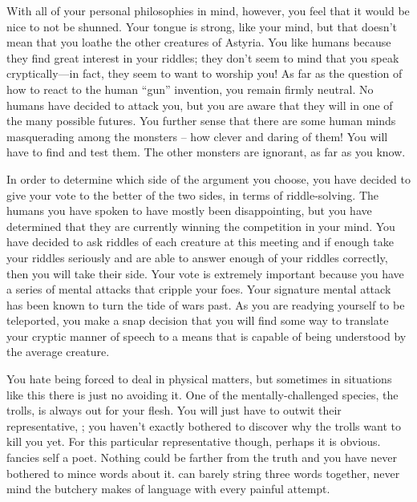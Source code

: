 \documentclass[char]{guildcamp2}
\begin{document}
With all of your personal philosophies in mind, however, you feel that it would be nice to not be shunned. Your tongue is strong, like your mind, but that doesn't mean that you loathe the other creatures of Astyria. You like humans because they find great interest in your riddles; they don't seem to mind that you speak cryptically---in fact, they seem to want to worship you! As far as the question of how to react to the human ``gun'' invention, you remain firmly neutral. No humans have decided to attack you, but you are aware that they will in one of the many possible futures. You further sense that there are some human minds masquerading among the monsters -- how clever and daring of them! You will have to find and test them. The other monsters are ignorant, as far as you know.

In order to determine which side of the argument you choose, you have decided to give your vote to the better of the two sides, in terms of riddle-solving. The humans you have spoken to have mostly been disappointing, but you have determined that they are currently winning the competition in your mind. You have decided to ask riddles of each creature at this meeting and if enough take your riddles seriously and are able to answer enough of your riddles correctly, then you will take their side. Your vote is extremely important because you have a series of mental attacks that cripple your foes. Your signature mental attack has been known to turn the tide of wars past. As you are readying yourself to be teleported, you make a snap decision that you will find some way to translate your cryptic manner of speech to a means that is capable of being understood by the average creature. 

You hate being forced to deal in physical matters, but sometimes in situations like this there is just no avoiding it. One of the mentally-challenged species, the trolls, is always out for your flesh. You will just have to outwit their representative, \cTroll{}; you haven't exactly bothered to discover why the trolls want to kill you yet. For this particular representative though, perhaps it is obvious. \cTroll{} fancies \cTroll{\them}self a poet. Nothing could be farther from the truth and you have never bothered to mince words about it. \cTroll{\They} can barely string three words together, never mind the butchery \cTroll{\they} makes of language with every painful attempt.
\end{document}
